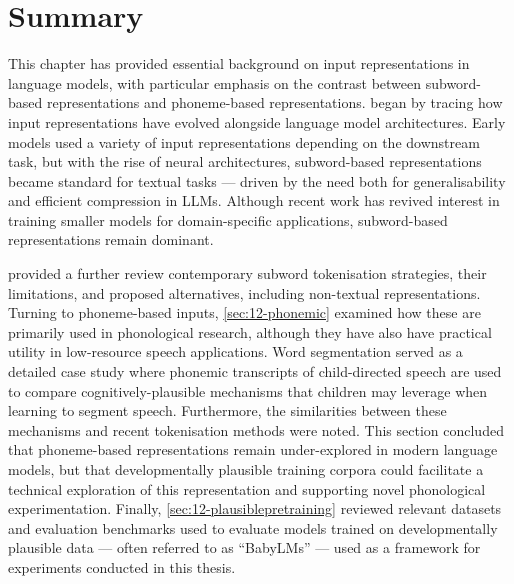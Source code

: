 
\section{Summary}


This chapter has provided essential background on input representations in language models, with particular emphasis on the contrast between subword-based representations and phoneme-based representations.  began by tracing how input representations have evolved alongside language model architectures. Early \ngram models used a variety of input representations depending on the downstream task, but with the rise of neural architectures, subword-based representations became standard for textual tasks --- driven by the need both for generalisability and efficient compression in LLMs. Although recent work has revived interest in training smaller models for domain-specific applications, subword-based representations remain dominant.

 provided a further review contemporary subword tokenisation strategies, their limitations, and proposed alternatives, including non-textual representations. Turning to phoneme-based inputs, \cref{sec:12-phonemic} examined how these are primarily used in phonological research, although they have also have practical utility in low-resource speech applications. Word segmentation served as a detailed case study where phonemic transcripts of child-directed speech are used to compare cognitively-plausible mechanisms that children may leverage when learning to segment speech. Furthermore, the similarities between these mechanisms and recent tokenisation methods were noted. This section concluded that phoneme-based representations remain under-explored in modern language models, but that developmentally plausible training corpora could facilitate a technical exploration of this representation and supporting novel phonological experimentation. Finally, \cref{sec:12-plausiblepretraining} reviewed relevant datasets and evaluation benchmarks used to evaluate models trained on developmentally plausible data --- often referred to as ``BabyLMs'' --- used as a framework for experiments conducted in this thesis. 

